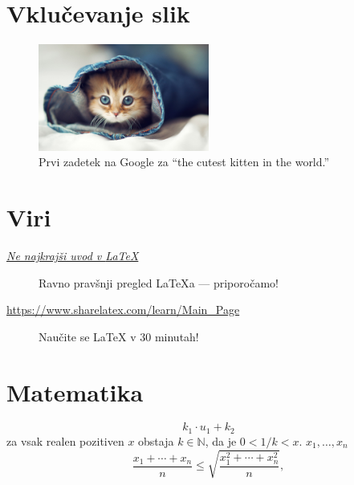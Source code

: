 \documentclass[a4paper, 10pt]{article}
\begin{document}
\section{Vklučevanje slik}
\begin{figure}
    \centering
    \includegraphics[width=0.5\textwidth]{muca.jpg}
    \caption{Prvi zadetek na Google za ``the cutest kitten in the world.''}
\end{figure}
\begin{center}
\end{center}


\section{Viri}
\begin{description}
    \item[\href{http://www-lp.fmf.uni-lj.si/plestenjak/vaje/latex/lshort.pdf}{\emph{Ne najkrajši uvod v {\LaTeX}}}]
    Ravno pravšnji pregled {\LaTeX}a --- priporočamo!
  
    \item[\url{https://www.sharelatex.com/learn/Main_Page}]
    Naučite se LaTeX v 30 minutah!
\end{description}



\section{Matematika}
\label{sec:matematika}
\[ k_{1} \cdot u_{1} + k_{2} \]
za vsak realen pozitiven $x$ obstaja $k \in \mathbb{N}$, da je $0 < 1/k < x$.
$x_1, \ldots, x_n$
\[
  \frac{x_1 + \cdots + x_n}{n} \leq
  \sqrt{\frac{x_1^2 + \cdots + x_n^2}{n}},
\]
\end{document}
